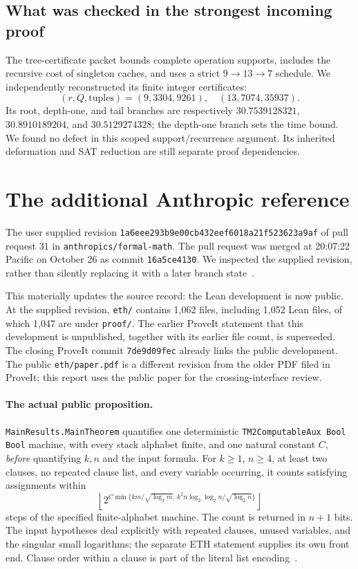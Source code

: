 \subsection{What was checked in the strongest incoming proof}
The tree-certificate packet bounds complete operation supports, includes the
recursive cost of singleton caches, and uses a strict $9\to13\to7$ schedule.
We independently reconstructed its finite integer certificates:
\[
 (r,Q,\text{tuples})=(9,3304,9261),\quad(13,7074,35937).
\]
Its root, depth-one, and tail branches are respectively
$30.7539128321$, $30.8910189204$, and $30.5129274328$; the depth-one branch
sets the time bound. We found no defect in this scoped support/recurrence
argument. Its inherited deformation and SAT reduction are still separate
proof dependencies.

\section{The additional Anthropic reference}
\label{sec:anthropic}

The user supplied revision
\texttt{1a6eee293b9e00cb432eef6018a21f523623a9af} of pull request 31 in
\texttt{anthropics/formal-math}. The pull request was merged at
20:07:22 Pacific on October 26 as commit \texttt{16a5ce4130}. We inspected the supplied revision, rather
than silently replacing it with a later branch state~\cite{anthropic-pr}.

This materially updates the source record: the Lean development is now
public. At the supplied revision, \texttt{eth/} contains 1,062 files,
including 1,052 Lean files, of which 1,047 are under \texttt{proof/}.
The earlier ProveIt statement that this development is unpublished, together
with its earlier file count, is superseded. The closing ProveIt commit
\texttt{7de9d09fec} already links the public development. The public
\texttt{eth/paper.pdf} is a different revision from the older PDF filed in
ProveIt; this report uses the public paper for the crossing-interface review.

\paragraph{The actual public proposition.}
\texttt{MainResults.MainTheorem} quantifies one deterministic
\texttt{TM2ComputableAux Bool Bool} machine, with every stack alphabet finite,
and one natural constant $C$, \emph{before} quantifying $k,n$ and the input
formula. For $k\ge1$, $n\ge4$, at least two clauses, no repeated clause list,
and every variable occurring, it counts satisfying assignments within
\begin{equation}
 \left\lfloor 2^{C\min\{km/\sqrt{\log_2m},\,
       k^2n\log_2\log_2n/\sqrt{\log_2n}\}}\right\rfloor
 \label{eq:anthropic-bound}
\end{equation}
steps of the specified finite-alphabet machine. The count is returned in
$n+1$ bits. The input hypotheses deal explicitly with repeated clauses,
unused variables, and the singular small logarithms; the separate ETH
statement supplies its own front end. Clause order within a clause is part
of the literal list encoding~\cite{anthropic-statement}.

